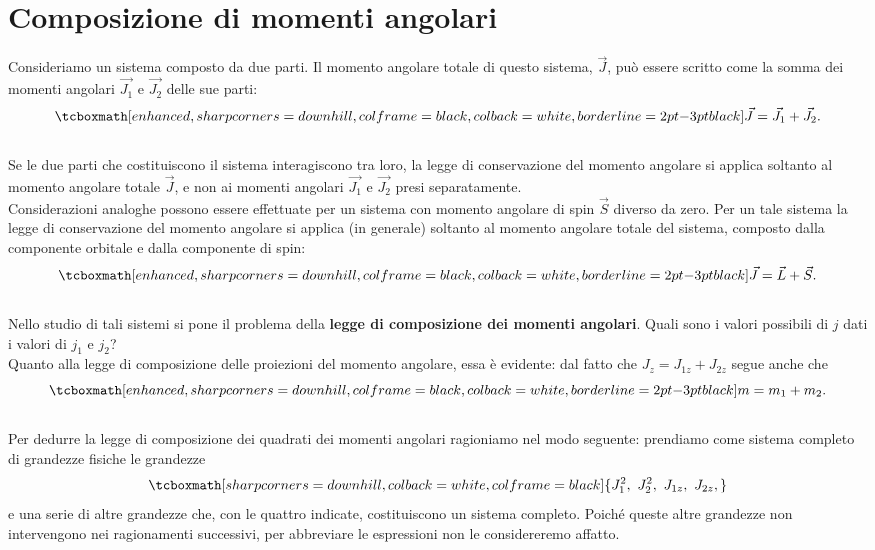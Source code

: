 \chapter[Composizione di momenti angolari]{Composizione di momenti angolari}
Consideriamo un sistema composto da due parti. Il momento angolare totale di questo sistema, $\vec{J}$, può essere scritto come la somma dei momenti angolari $\vec{J_1}$ e $\vec{J_2}$ delle sue parti:
	\begin{equation}
		\label{eq:cap19_01}
		\tcboxmath[enhanced, sharp corners=downhill, colframe=black, colback=white, borderline={2pt}{-3pt}{black}]{
			\vec{J} = \vec{J_1} + \vec{J_2}.
			}
	\end{equation}\\
	
Se le due parti che costituiscono il sistema interagiscono tra loro, la legge di conservazione del momento angolare si applica soltanto al momento angolare totale $\vec{J}$, e non ai momenti angolari $\vec{J_1}$ e $\vec{J_2}$ presi separatamente.\\

Considerazioni analoghe possono essere effettuate per un sistema con momento angolare di spin $\vec{S}$ diverso da zero. Per un tale sistema la legge di conservazione del momento angolare si applica (in generale) soltanto al momento angolare totale del sistema, composto dalla componente orbitale e dalla componente di spin:
	\begin{equation}
		\tcboxmath[enhanced, sharp corners=downhill, colframe=black, colback=white, borderline={2pt}{-3pt}{black}]{
			\vec{J} = \vec{L} + \vec{S}.
			}
	\end{equation}\\
	
Nello studio di tali sistemi si pone il problema della \textbf{legge di composizione dei momenti angolari}. Quali sono i valori possibili di $j$ dati i valori di $j_1$ e $j_2$? \\

Quanto alla legge di composizione delle proiezioni del momento angolare, essa è evidente: dal fatto che $J_z = J_{1z} + J_{2z}$ segue anche che 
	\begin{equation}
		\label{eq:cap19_02}
		\tcboxmath[enhanced, sharp corners=downhill, colframe=black, colback=white, borderline={2pt}{-3pt}{black}]{
			m= m_1 + m_2.
			}
	\end{equation}\\
	
Per dedurre la legge di composizione dei quadrati dei momenti angolari ragioniamo nel modo seguente: prendiamo come sistema completo di grandezze fisiche le grandezze
	\begin{equation}
		\tcboxmath[sharp corners=downhill, colback=white, colframe=black]{
			J_1^2 ,~ J_2^2 ,~ J_{1z} ,~ J_{2z} ,
			}
	\end{equation}
e una serie di altre grandezze che, con le quattro indicate, costituiscono un sistema completo. Poiché queste altre grandezze non intervengono nei ragionamenti successivi, per abbreviare le espressioni non le considereremo affatto.\\

